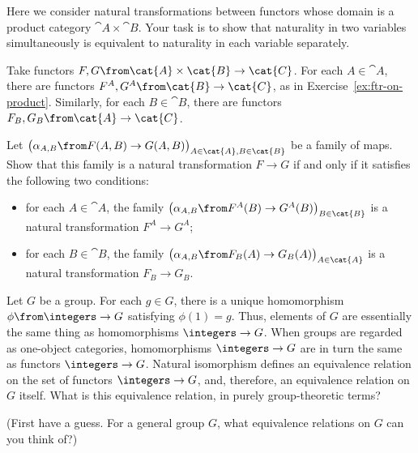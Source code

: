 \begin{question}        
\label{ex:nat-iso-on-product}
Here we consider natural transformations between functors whose domain
is a product%
%
%
category $\cat{A} \times \cat{B}$.  Your task is to show that naturality in
two variables simultaneously is equivalent to naturality in each variable
separately.

Take functors $F, G\from \cat{A} \times \cat{B} \to \cat{C}$.  For each $A
\in \cat{A}$, there are functors $F^A, G^A\from \cat{B} \to \cat{C}$, as in
Exercise~\ref{ex:ftr-on-product}.  Similarly, for each $B\in\cat{B}$,
there are functors $F_B, G_B\from \cat{A} \to \cat{C}$.

Let $\bigl(\alpha_{A, B}\from F(A, B) \to G(A, B)\bigr)_{A \in \cat{A}, B
  \in \cat{B}}$ be a family of maps.  Show that this family is a natural
transformation $F \to G$ if and only if it satisfies the following two
conditions: 
% 
\begin{itemize}
\item 
for each $A \in \cat{A}$, the family $\bigl(\alpha_{A, B}\from F^A(B) \to
G^A(B)\bigr)_{B \in \cat{B}}$ is a natural transformation $F^A \to G^A$;

\item 
for each $B \in \cat{B}$, the family $\bigl(\alpha_{A, B}\from F_B(A) \to
G_B(A)\bigr)_{A \in \cat{A}}$ is a natural transformation $F_B \to G_B$.
\end{itemize}
\end{question}


\begin{question}
Let $G$ be a group.%
%
%
For each $g \in G$, there is a unique homomorphism
$\phi\from \integers \to G$%
%
%
satisfying $\phi(1) = g$.  Thus, elements of $G$ are essentially the same
thing as homomorphisms $\integers \to G$.  When groups are regarded as
one-object categories, homomorphisms $\integers \to G$ are in turn the same
as functors $\integers \to G$.  Natural isomorphism defines an equivalence
relation on the set of functors $\integers \to G$, and, therefore, an
equivalence relation on $G$ itself.  What is this equivalence relation, in
purely group-theoretic terms?

(First have a guess.  For a general group $G$, what equivalence
relations on $G$ can you think of?)
\end{question}



